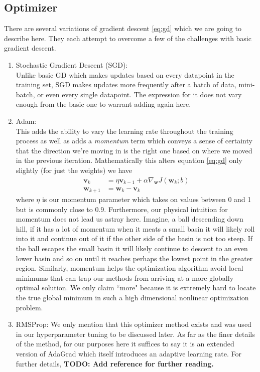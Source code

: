 \documentclass[11pt]{amsart}
\begin{document}
\subsection{Optimizer}
There are several variations of gradient descent \eqref{eq:gd} which we are going to describe here.
They each attempt to overcome a few of the challenges with basic gradient descent.
\begin{enumerate}
\item Stochastic Gradient Descent (SGD): \\
Unlike basic GD which makes updates based on every datapoint in the training set, SGD makes updates more frequently after a batch of data, mini-batch, or even every single datapoint.
The expression for it does not vary enough from the basic one to warrant adding again here.
\item Adam: \\
This adds the ability to vary the learning rate throughout the training process as well as adds a \textit{momentum} term which conveys a sense of certainty that the direction we're moving in is the right one based on where we moved in the previous iteration.
Mathematically this alters equation \eqref{eq:gd} only slightly (for just the weights) we have
\begin{equation}
\begin{split}
\bm v_k &= \eta \bm v_{k-1}  + \alpha \nabla_{\bm w} J(\bm w_{k}; b) \\
\bm w_{k + 1} &= \bm w_{k} - \bm v_k
\end{split}
\end{equation}
where $\eta$ is our momentum parameter which takes on values between 0 and 1 but is commonly close to $0.9$.
Furthermore, our physical intuition for momentum does not lead us astray here.
Imagine, a ball descending down hill, if it has a lot of momentum when it meats a small basin it will likely roll into it and continue out of it if the other side of the basin is not too steep.
If the ball escapes the small basin it will likely continue to descent to an even lower basin and so on until it reaches perhaps the lowest point in the greater region.
Similarly, momentum helps the optimization algorithm avoid local minimums that can trap our methods from arriving at a more globally optimal solution.
We only claim ``more" because it is extremely hard to locate the true global minimum in such a high dimensional nonlinear optimization problem.

\item RMSProp:
We only mention that this optimizer method exists and was used in our hyperparameter tuning to be discussed later.
As far as the finer details of the method, for our purposes here it suffices to say it is an extended version of AdaGrad which itself introduces an adaptive learning rate. For further details, \textbf{TODO: Add reference for further reading.}
\end{enumerate}
\end{document}
